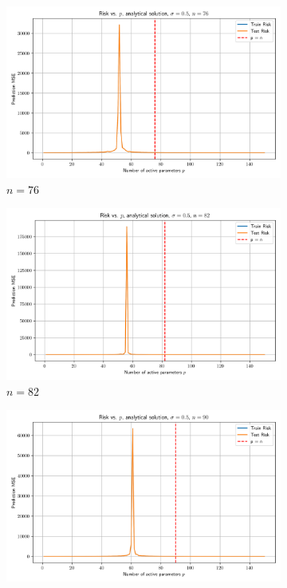 \documentclass[twoside,10pt]{article}
\begin{document}
\begin{figure}[htb]
  \begin{subfigure}[b]{\imgwidth}
    \includegraphics[width=\linewidth]{img2/risk_curve_n76.png}
    \caption{$n=76$}\label{fig:2e}
  \end{subfigure}%
  \hfill
  \begin{subfigure}[b]{\imgwidth}
    \includegraphics[width=\linewidth]{img2/risk_curve_n82.png}
    \caption{$n=82$}\label{fig:2f}
  \end{subfigure}%
  \hfill
  \begin{subfigure}[b]{\imgwidth}
    \includegraphics[width=\linewidth]{img2/risk_curve_n90.png}

\end{subfigure}
\end{figure}
\end{document}
